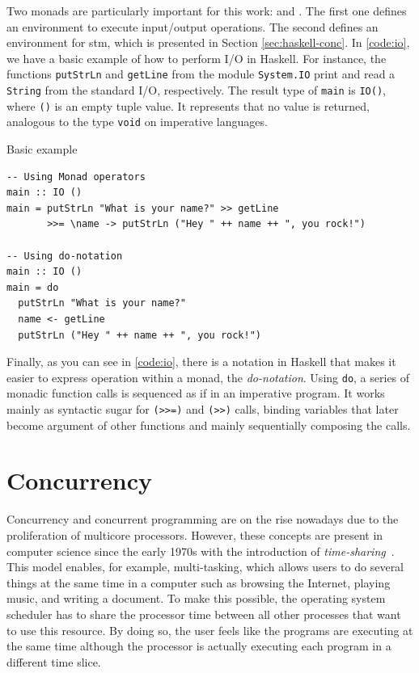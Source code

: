 Two monads are particularly important for this work: \IO and \STM. The first one defines an environment to execute input/output operations. The second defines an environment for \acl{stm}, which is presented in Section \ref{sec:haskell-conc}. In \autoref{code:io}, we have a basic example of how to perform I/O in Haskell. For instance, the functions \texttt{putStrLn} and \texttt{getLine} from the module \texttt{System.IO} print and read a \texttt{String} from the standard I/O, respectively. The result type of \texttt{main} is \texttt{IO()}, where \texttt{()} is an empty tuple value. It represents that no value is returned, analogous to the type \texttt{void} on imperative languages.

\begin{listing}
  \caption{Basic \IO example}
  \begin{verbatim}
-- Using Monad operators
main :: IO ()
main = putStrLn "What is your name?" >> getLine
       >>= \name -> putStrLn ("Hey " ++ name ++ ", you rock!")

-- Using do-notation
main :: IO ()
main = do
  putStrLn "What is your name?"
  name <- getLine
  putStrLn ("Hey " ++ name ++ ", you rock!")
  \end{verbatim}
  \label{code:io}
\end{listing}

Finally, as you can see in \autoref{code:io}, there is a notation in Haskell that makes it easier to express operation within a monad, the \emph{do-notation}. Using \texttt{do}, a series of monadic function calls is sequenced as if in an imperative program. It works mainly as syntactic sugar for \texttt{(>{}>=)} and \texttt{(>{}>)} calls, binding variables that later become argument of other functions and mainly sequentially composing the calls.


\section{Concurrency}\label{sec:conc}
Concurrency and concurrent programming are on the rise nowadays due to the proliferation of multicore processors. However, these concepts are present in computer science since the early 1970s with the introduction of \emph{time-sharing}~\cite{lea:2006}. This model enables, for example, multi-tasking, which allows users to do several things at the same time in a computer such as browsing the Internet, playing music, and writing a document. To make this possible, the operating system scheduler has to share the processor time between all other processes that want to use this resource. By doing so, the user feels like the programs are executing at the same time although the processor is actually executing each program in a different time slice.

